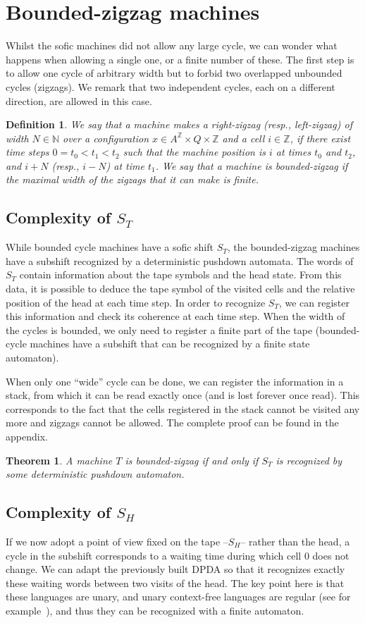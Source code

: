 \documentclass{llncs}
\newtheorem{teo}{Theorem}
\newtheorem{defi}{Definition}
\newcommand{\az}{A^\Zset}
\newcommand{\Zset}{{\mathbb Z}}
\newcommand{\Nset}{{\mathbb N}}
\begin{document}
\section{Bounded-zigzag machines}
Whilst the sofic machines did not allow any large cycle, we can wonder what happens when allowing a single one, or a finite number of these.
The first step is to allow one cycle of arbitrary width but to forbid two overlapped unbounded cycles (zigzags).
We remark that two independent cycles, each on a different direction, are allowed in this case.
\begin{defi}
 We say that a machine makes a \emph{right-zigzag} (resp., \emph{left-zigzag}) of width $N\in\Nset$ over a configuration $x\in\az\times Q\times\Zset$ and a cell $i\in\Zset$, if there exist time steps $0=t_0<t_1<t_{2}$ such that the machine position is $i$ at times $t_{0}$ and $t_2$, and $i+N$ (resp., $i-N$) at time $t_{1}$.
We say that a machine is \emph{bounded-zigzag} if the maximal width of the zigzags that it can make is finite.
\end{defi}
\subsection{Complexity of $S_T$}
While bounded cycle machines have a sofic shift $S_T$, the bounded-zigzag machines have a subshift recognized by a deterministic pushdown automata.
The words of $S_T$ contain information about the tape symbols and the head state.
From this data, it is possible to deduce the tape symbol of the visited cells and the relative position of the head at each time step.
In order to recognize $S_T$, we can register this information and check its coherence at each time step.
When the width of the cycles is bounded, we only need to register a finite part of the tape (bounded-cycle machines have a subshift that can be recognized by a finite state automaton).

When only one ``wide'' cycle can be done, we can register the information in a stack, from which it can be read exactly once (and is lost forever once read).
This corresponds to the fact that the cells registered in the stack cannot be visited any more and zigzags cannot be allowed. The complete proof can be found in the appendix.\begin{teo}\label{t:zigstack}
A machine $T$ is bounded-zigzag if and only if $S_T$ is recognized by some deterministic pushdown automaton.
\end{teo}
\subsection{Complexity of $S_H$}
If we now adopt a point of view fixed on the tape --$S_H$-- rather than the head, a cycle in the subshift corresponds to a waiting time during which cell $0$ does not change.
We can adapt the previously built DPDA so that it recognizes exactly these waiting words between two visits of the head.
The key point here is that these languages are unary, and unary context-free languages are regular (see for example~\cite{Gins62}), and thus they can be recognized with a finite automaton.
\end{document}
